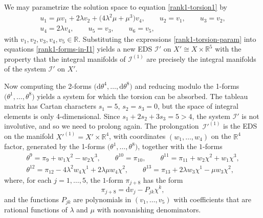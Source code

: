 \documentclass[pdftex]{sigma}
\numberwithin{equation}{section}
\renewcommand{\d}{\mathrm{d}}%
\newcommand{\cI}{{\mathcal I}}
\newcommand{\bbR}{{\mathbb R}}
\begin{document}
We may parametrize the solution space to equation \eqref{rank1-torsion1} by
\begin{gather}
u_1 = \mu v_1 + 2\lambda v_2 +\big(4\lambda^2\mu + \mu^3\big) v_4, \qquad u_2 = v_1, \qquad u_3 = v_2, \nonumber\\
u_4 = 2\lambda v_4, \qquad u_5 = v_3, \qquad u_6 = v_5,\label{rank1-torsion-param}
\end{gather}
with $v_1, v_2, v_3, v_4, v_5 \in \bbR$. Substituting the expressions \eqref{rank1-torsion-param} into equations \eqref{rank1-forms-in-I1} yields a new EDS $\cI'$ on $X' \cong X \times \bbR^5$ with the property that the integral manifolds of $\cI^{(1)}$ are precisely the integral manifolds of the system $\cI'$ on $X'$.

Now computing the 2-forms $\big(\d\theta^4,\ldots,\d\theta^8\big)$ and reducing modulo the 1-forms $\big(\theta^1,\ldots,\theta^8\big)$ yields a system for which the torsion can be absorbed. The tableau matrix has Cartan characters $s_1 = 5$, $s_2 = s_3 = 0$, but the space of integral elements is only 4-dimensional. Since $s_1 + 2 s_2 + 3 s_3 = 5 > 4$, the system $\cI'$ is not involutive, and so we need to prolong again. The prolongation~$\cI'^{(1)}$ is the EDS on the manifold $X'^{(1)} = X' \times \bbR^4$, with coordinates $(w_1,\ldots, w_4)$ on the $\bbR^4$ factor, generated by the 1-forms $\big(\theta^1,\ldots, \theta^8\big)$, together with the $1$-forms
\begin{gather}
\theta^9 = \pi_9 + w_1 \chi^2 - w_2 \chi^3, \qquad
\theta^{10} = \pi_{10}, \qquad
\theta^{11} = \pi_{11} + w_2 \chi^2 + w_1 \chi^3, \nonumber\\
\theta^{12} = \pi_{12} - 4\lambda^2 w_4 \chi^1 + 2\lambda \mu w_4 \chi^2, \qquad
\theta^{13} = \pi_{13} + 2\lambda w_3 \chi^1 - \mu w_3 \chi^2,\label{rank1-forms-in-I'1}
\end{gather}
where, for each $j=1,\ldots, 5$, the $1$-form $\pi_{j+8}$ has the form
\[ \pi_{j+8} = \d v_j - P_{jk} \chi^k, \]
and the functions $P_{jk}$ are polynomials in $(v_1,\ldots, v_5)$ with coefficients that are rational functions of $\lambda$ and $\mu$ with nonvanishing denominators.
\end{document}
